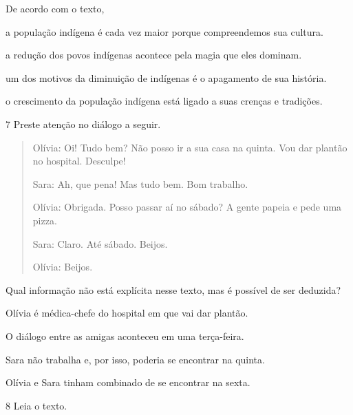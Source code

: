 De acordo com o texto,

\begin{escolha}
\item a população indígena é cada vez maior porque compreendemos sua cultura.

\item a redução dos povos indígenas acontece pela magia que eles dominam.

\item um dos motivos da diminuição de indígenas é o apagamento de sua história.

\item o crescimento da população indígena está ligado a suas crenças e tradições.
\end{escolha}


\num{7} Preste atenção no diálogo a seguir.

\begin{quote}
Olívia: Oi! Tudo bem? Não posso ir a sua casa na quinta. Vou dar plantão
no hospital. Desculpe!

Sara: Ah, que pena! Mas tudo bem. Bom trabalho.

Olívia: Obrigada. Posso passar aí no sábado? A gente papeia e pede uma
pizza.

Sara: Claro. Até sábado. Beijos.

Olívia: Beijos.

\end{quote}

Qual informação não está explícita nesse texto, mas é possível de ser
deduzida?

\begin{escolha}
\item Olívia é médica-chefe do hospital em que vai dar plantão.

\item O diálogo entre as amigas aconteceu em uma terça-feira.

\item Sara não trabalha e, por isso, poderia se encontrar na quinta.

\item Olívia e Sara tinham combinado de se encontrar na sexta.
\end{escolha}


\num{8} Leia o texto.

